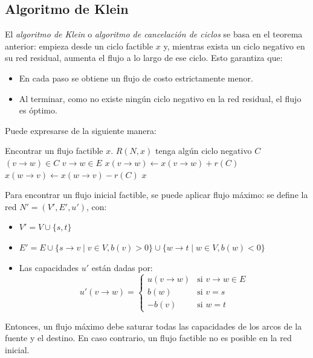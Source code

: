 \documentclass[a4paper]{report}
\newcommand{\si}{\text{si }}
\newcommand{\Each}{\kw{each}\ }
\begin{document}
\subsection{Algoritmo de Klein}

El \textit{algoritmo de Klein} o \textit{algoritmo de cancelación de ciclos} se basa en el teorema anterior: empieza desde un ciclo factible $x$ y, mientras exista un ciclo negativo en su red residual, aumenta el flujo a lo largo de ese ciclo. Esto garantiza que:
\begin{itemize}
    \item En cada paso se obtiene un flujo de costo estrictamente menor.
    \item Al terminar, como no existe ningún ciclo negativo en la red residual, el flujo es óptimo.
\end{itemize}

Puede expresarse de la siguiente manera:

\begin{codebox}
    \li Encontrar un flujo factible $x$.
    \li \While $R(N, x)$ tenga algún ciclo negativo $C$ \Do
    \li \For \Each $(v \rightarrow w) \in C$ \Do
    \li \If $v \rightarrow w \in E$ \Then
    \li $x(v \rightarrow w) \gets x(v \rightarrow w) + r(C)$
    \li \Else
    \li $x(w \rightarrow v) \gets x(w \rightarrow v) - r(C)$
    \End
    \End
    \End
    \Return $x$
\end{codebox}

Para encontrar un flujo inicial factible, se puede aplicar flujo máximo: se define la red $N' = (V', E', u')$, con:
\begin{itemize}
    \item $V' = V \cup \{s, t\}$
    \item $E' = E \cup \{s \rightarrow v \mid v \in V, b(v) > 0\} \cup \{w \rightarrow t \mid w \in V, b(w) < 0\}$
    \item Las capacidades $u'$ están dadas por:
        $$
        u'(v \rightarrow w) =
        \begin{cases}
            u(v \rightarrow w) & \si v \rightarrow w \in E \\
            b(w) & \si v = s \\
            -b(v) & \si w = t
        \end{cases}
        $$
\end{itemize}

Entonces, un flujo máximo debe saturar todas las capacidades de los arcos de la fuente y el destino. En caso contrario, un flujo factible no es posible en la red inicial. %
\end{document}
